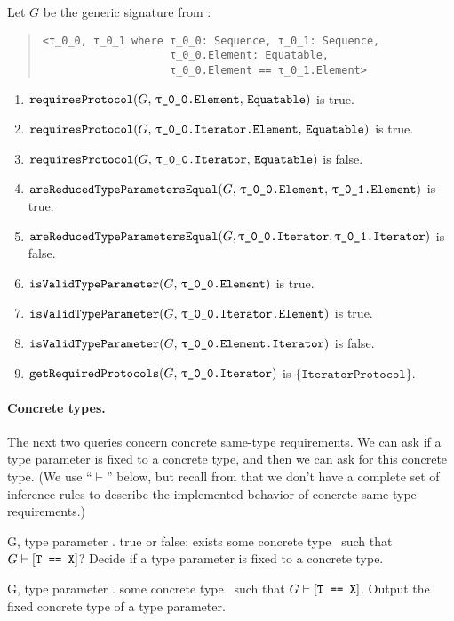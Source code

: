 \documentclass[../generics]{subfiles}
\begin{document}
\begin{example}
Let $G$ be the generic signature from :
\begin{quote}
\begin{verbatim}
<τ_0_0, τ_0_1 where τ_0_0: Sequence, τ_0_1: Sequence,
                    τ_0_0.Element: Equatable,
                    τ_0_0.Element == τ_0_1.Element>
\end{verbatim}
\end{quote}
\begin{enumerate}
\item $\Query{requiresProtocol}{G,\, \texttt{\rT.Element},\,\texttt{Equatable}}$ is true.
\item $\Query{requiresProtocol}{G,\, \texttt{\rT.Iterator.Element},\, \texttt{Equatable}}$ is true.
\item $\Query{requiresProtocol}{G,\, \texttt{\rT.Iterator},\, \texttt{Equatable}}$ is false.
\item $\Query{areReducedTypeParametersEqual}{G,\, \texttt{\rT.Element},\, \texttt{\rU.Element}}$ is true.
\item $\Query{areReducedTypeParametersEqual}{G, \texttt{\rT.Iterator}, \texttt{\rU.Iterator}}$ is false.
\item $\Query{isValidTypeParameter}{G,\, \texttt{\rT.Element}}$ is true.
\item $\Query{isValidTypeParameter}{G,\, \texttt{\rT.Iterator.Element}}$ is true.
\item $\Query{isValidTypeParameter}{G,\, \texttt{\rT.Element.Iterator}}$ is false.
\item $\Query{getRequiredProtocols}{G,\, \texttt{\rT.Iterator}}$ is $\{\texttt{IteratorProtocol}\}$.
\end{enumerate}
\end{example}

\paragraph{Concrete types.} The next two queries concern concrete same-type requirements. We can ask if a type parameter is fixed to a concrete type, and then we can ask for this concrete type. (We use ``$\vdash$'' below, but recall from  that we don't have a complete set of inference rules to describe the implemented behavior of concrete same-type requirements.)

\begin{itemize}
{G, \tT}
{type parameter \tT.}
{true or false: exists some concrete type \tX\ such that $G\vdash[\texttt{T == X}]$?}
{Decide if a type parameter is fixed to a concrete type.}

{G, \tT}
{type parameter \tT.}
{some concrete type \tX\ such that $G\vdash[\texttt{T == X}]$.}
{Output the fixed concrete type of a type parameter.}
\end{itemize}
\end{document}

